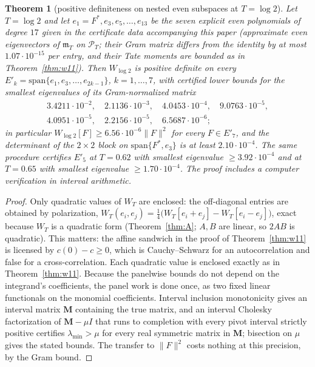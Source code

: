 \documentclass[11pt]{amsart}
\newtheorem{theorem}{Theorem}[section]
\theoremstyle{definition}
\theoremstyle{remark}
\newcommand{\PT}{\mathcal P_T}
\newcommand{\mT}{\mathfrak m_T}
\begin{document}
\begin{theorem}[positive definiteness on nested even subspaces at $T=\log2$]\label{thm:nest}
Let $T=\log2$ and let $e_1=F^*,e_3,e_5,\dots,e_{13}$ be the seven explicit even polynomials of degree $17$ given in the
certificate data accompanying this paper (approximate even eigenvectors of $\mT$ on $\PT$; their Gram matrix
differs from the identity by at most $1.07\cdot10^{-15}$ per entry, and their Tate moments are bounded as in
Theorem~\ref{thm:w11}). Then $W_{\log2}$ is positive definite on every
$E'_k=\mathrm{span}\{e_1,e_3,\dots,e_{2k-1}\}$, $k=1,\dots,7$, with certified lower bounds for the smallest
eigenvalues of its Gram-normalized matrix
\begin{gather*}
3.4211\cdot10^{-2},\quad2.1136\cdot10^{-3},\quad4.0453\cdot10^{-4},\quad9.0763\cdot10^{-5},\\
4.0951\cdot10^{-5},\quad2.2156\cdot10^{-5},\quad6.5687\cdot10^{-6};
\end{gather*}
in particular $W_{\log2}[F]\ge6.56\cdot10^{-6}\|F\|^2$ for every $F\in E'_7$, and the determinant of the
$2\times2$ block on $\mathrm{span}\{F^*,e_3\}$ is at least $2.10\cdot10^{-4}$. The same procedure certifies $E'_5$ at $T=0.62$
with smallest eigenvalue $\ge3.92\cdot10^{-4}$ and at $T=0.65$ with smallest eigenvalue $\ge1.70\cdot10^{-4}$. The proof
includes a computer verification in interval arithmetic.
\end{theorem}
\begin{proof}
Only quadratic values of $W_T$ are enclosed: the off-diagonal entries are obtained by polarization,
$W_T(e_i,e_j)=\frac14\big(W_T[e_i+e_j]-W_T[e_i-e_j]\big)$, exact because $W_T$ is a quadratic form
(Theorem~\ref{thm:A}; $A,B$ are linear, so $2AB$ is quadratic). This matters: the affine sandwich in the proof of
Theorem~\ref{thm:w11} is licensed by $c(0)-c\ge0$, which is Cauchy--Schwarz for an autocorrelation and false for a
cross-correlation. Each quadratic value is enclosed exactly as in Theorem~\ref{thm:w11}. Because the panelwise
bounds do not depend on the integrand's coefficients, the panel work is done once, as two fixed linear functionals
on the monomial coefficients. Interval inclusion monotonicity gives an interval matrix $\boldsymbol M$ containing the
true matrix, and an interval Cholesky factorization of $\boldsymbol M-\mu I$ that runs to completion with every pivot
interval strictly positive certifies $\lambda_{\min}>\mu$ for every real symmetric matrix in $\boldsymbol M$; bisection on
$\mu$ gives the stated bounds. The transfer to $\|F\|^2$ costs nothing at this precision, by the Gram bound.
\end{proof}
\end{document}
